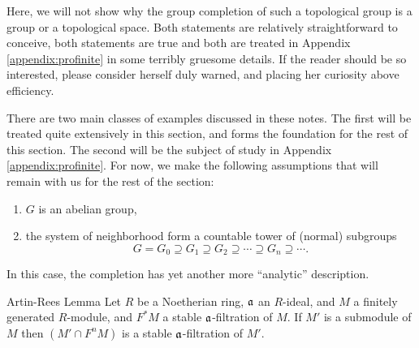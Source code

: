 \begin{rmk}
Here, we will not show why the group completion of such a 
topological group is a group or a topological space. Both 
statements are relatively straightforward to conceive, both 
statements are true and both are treated in Appendix 
\ref{appendix:profinite} in some terribly gruesome details. If
the reader should be so interested, please consider herself
duly warned, and placing her curiosity above efficiency.
\end{rmk}

There are two main classes of examples discussed in these notes.
The first will be treated quite extensively in this section, and 
forms the foundation for the rest of this section. The second will 
be the subject of study in Appendix \ref{appendix:profinite}. For
now, we make the following assumptions that will remain with us 
for the rest of the section:

\begin{enumerate}
\item $G$ is an abelian group,

\item the system of neighborhood form a countable tower of (normal)
subgroups
\[
G = G_0 \supseteq G_1 \supseteq G_2 \supseteq \cdots \supseteq G_n 
\supseteq \cdots.
\]
\end{enumerate}

In this case, the completion has yet another more ``analytic'' 
description.

\begin{thm}{Artin-Rees Lemma}\label{thm:artin_rees_lemma}
Let $R$ be a Noetherian ring, $\mathfrak{a}$ an $R$-ideal, and $M$ a
finitely generated $R$-module, and $F^*M$ a stable 
$\mathfrak{a}$-filtration of $M$. If $M'$ is a submodule of $M$ then
$(M' \cap F^nM)$ is a stable $\mathfrak{a}$-filtration of $M'$.
\end{thm}
